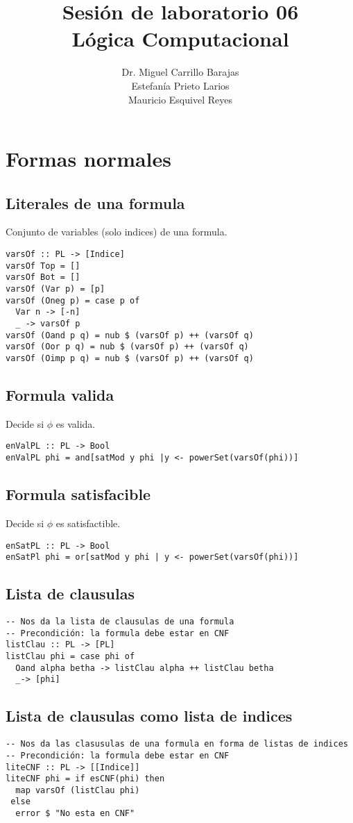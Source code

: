 \documentclass[11pt]{article}
\author{Dr. Miguel Carrillo Barajas \\
Estefanía Prieto Larios \\
Mauricio Esquivel Reyes \\
}
\date{}
\title{Sesión de laboratorio 06 \\
Lógica Computacional}
\begin{document}
\maketitle
\section{Formas normales}
\label{sec:org42b6a60}
\subsection{Literales de una formula}
\label{sec:orgd6aef05}
Conjunto de variables (solo indices) de una formula.
\begin{verbatim}
varsOf :: PL -> [Indice]
varsOf Top = []
varsOf Bot = []
varsOf (Var p) = [p]
varsOf (Oneg p) = case p of
  Var n -> [-n]
  _ -> varsOf p 
varsOf (Oand p q) = nub $ (varsOf p) ++ (varsOf q)
varsOf (Oor p q) = nub $ (varsOf p) ++ (varsOf q)
varsOf (Oimp p q) = nub $ (varsOf p) ++ (varsOf q)
\end{verbatim}
\subsection{Formula valida}
\label{sec:orgd740ba2}
Decide si \(\phi\) es valida.
\begin{verbatim}
enValPL :: PL -> Bool
enValPL phi = and[satMod y phi |y <- powerSet(varsOf(phi))]
\end{verbatim}
\subsection{Formula satisfacible}
\label{sec:orgf37a8ee}
Decide si \(\phi\) es satisfactible.
\begin{verbatim}
enSatPL :: PL -> Bool
enSatPl phi = or[satMod y phi | y <- powerSet(varsOf(phi))]
\end{verbatim}
\subsection{Lista de clausulas}
\label{sec:org7fa4778}
\begin{verbatim}
-- Nos da la lista de clausulas de una formula
-- Precondición: la formula debe estar en CNF
listClau :: PL -> [PL]
listClau phi = case phi of 
  Oand alpha betha -> listClau alpha ++ listClau betha 
  _-> [phi]
\end{verbatim}
\subsection{Lista de clausulas como lista de indices}
\label{sec:orga98602b}
\begin{verbatim}
-- Nos da las clasusulas de una formula en forma de listas de indices
-- Precondición: la formula debe estar en CNF
liteCNF :: PL -> [[Indice]]
liteCNF phi = if esCNF(phi) then 
  map varsOf (listClau phi)
 else
  error $ "No esta en CNF"
\end{verbatim}
\end{document}
